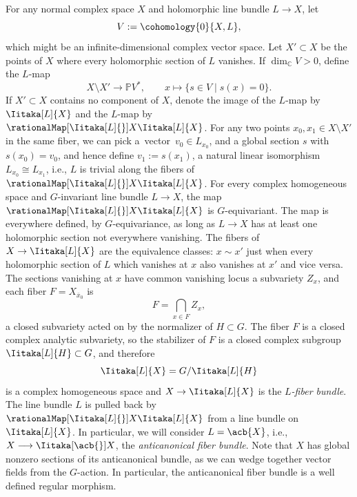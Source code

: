 \documentclass[pdftex]{sigma}
\numberwithin{equation}{section}
\renewcommand{\C}{\mathbb{C}}
\newcommand*{\dimC}[1]{\ensuremath{\dim_{\C} \! #1}}
\newcommand*{\acf}[1]{\Iitaka[\acb{}]{#1}}
\begin{document}
For any normal complex space $X$ and holomorphic line bundle $L \to X$, let
\[
V := \cohomology{0}{X, L},
\]
which might be an infinite-dimensional complex vector space.
Let $X' \subset X$ be the points of $X$ where every holomorphic section of $L$ vanishes.
If $\dimC{ V} > 0$, define the $L$-map
\[
X\setminus X' \longrightarrow \mathbb{P}V^*, \qquad x \longmapsto \{s \in V\mid s(x)=0\}.
\]
If $X' \subset X$ contains no component of $X$, denote the image of the $L$-map by $\Iitaka[L]{X}$ and the $L$-map
by~$\rationalMap[\Iitaka[L]{}]{X}{\Iitaka[L]{X}}$.
For any two points $x_0, x_1 \in X\setminus X'$ in the same fiber, we can pick a~vector~${v_0 \in L_{x_0}}$, and a global
section $s$ with $s(x_0) = v_0$, and hence define $v_1 := s(x_1)$, a natural linear isomorphism $L_{x_0}
 \cong L_{x_1}$, i.e., $L$ is trivial along the fibers of $\rationalMap[\Iitaka[L]{}]{X}{\Iitaka[L]{X}}$.
For every complex homogeneous space  and $G$-invariant line bundle $L \to X$, the map $\rationalMap[\Iitaka[L]{}]{X}{\Iitaka[L]{X}}$ is $G$-equivariant.
The map is everywhere defined, by $G$-equivariance, as long as $L\to X$ has at least one holomorphic section not everywhere vanishing.
The fibers of $X \to \Iitaka[L]{X}$ are the equivalence classes: $x \sim x'$ just when every holomorphic section of $L$ which vanishes at $x$ also vanishes at $x'$ and vice versa.
The sections vanishing at $x$ have common vanishing locus a subvariety $Z_x$, and each fiber $F = X_{\overline{x}_0}$ is
\[
F = \bigcap_{x \in F} Z_x,
\]
a closed subvariety acted on by the normalizer of $H \subset G$.
The fiber $F$ is a closed complex analytic subvariety, so the stabilizer of $F$ is a closed complex subgroup $\Iitaka[L]{H}
 \subset G$, and therefore
 \[\Iitaka[L]{X} = G/\Iitaka[L]{H}\]
 is a complex homogeneous space and $X \to \Iitaka[L]{X}$ is the \emph{$L$-fiber bundle}.
The line bundle $L$ is pulled back by $\rationalMap[\Iitaka[L]{}]{X}{\Iitaka[L]{X}}$ from a line bundle on $\Iitaka[L]{X}$.
In particular, we will consider $L = \acb{X}$, i.e., $X \longrightarrow \acf{X}$, the \emph{anticanonical fiber bundle}.
Note that $X$ has global nonzero sections of its anticanonical bundle, as we can wedge together vector fields from the $G$-action.
In particular, the anticanonical fiber bundle is a well defined regular morphism.
\end{document}
